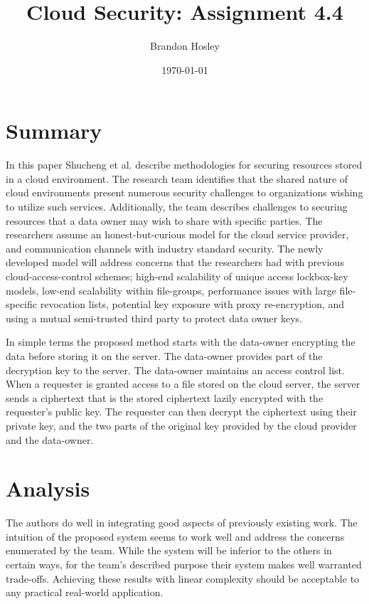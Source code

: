\documentclass[]{article}
\title{Cloud Security: Assignment 4.4}
\author{Brandon Hosley}
\date{\today}
\begin{document}
	\maketitle
	
\section{Summary} 

In this paper\cite{Shucheng2010} Shucheng et al. describe methodologies for securing resources stored in a cloud environment.
The research team identifies that the shared nature of cloud environments present numerous security challenges to organizations wishing to utilize such services.
Additionally, the team describes challenges to securing resources that a data owner may wish to share with specific parties.
The researchers assume an honest-but-curious model for the cloud service provider, and communication channels with industry standard security.
The newly developed model will address concerns that the researchers had with previous cloud-access-control schemes;
high-end scalability of unique access lockbox-key models, 
low-end scalability within file-groups,
performance issues with large file-specific revocation lists,
potential key exposure with proxy re-encryption,
and using a mutual semi-trusted third party to protect data owner keys.

In simple terms the proposed method starts with the data-owner encrypting the data before storing it on the server. 
The data-owner provides part of the decryption key to the server.
The data-owner maintains an access control list.
When a requester is granted access to a file stored on the cloud server, the server sends a ciphertext that is the stored ciphertext lazily encrypted with the requester's public key.
The requester can then decrypt the ciphertext using their private key, and the two parts of the original key provided by the cloud provider and the data-owner.

\section{Analysis}

The authors do well in integrating good aspects of previously existing work.
The intuition of the proposed system seems to work well and address the concerns enumerated by the team.
While the system will be inferior to the others in certain ways, for the team's described purpose their system makes well warranted trade-offs.
Achieving these results with linear complexity should be acceptable to any practical real-world application.


\clearpage


\end{document}
